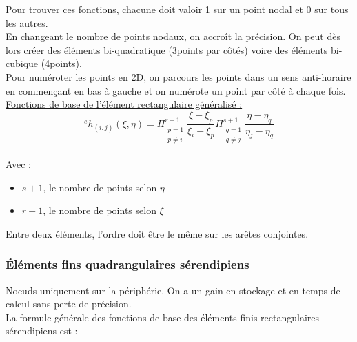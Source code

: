 \documentclass[../main.tex]{subfiles}
\begin{document}
\warning Pour trouver ces fonctions, chacune doit valoir 1 sur un point nodal et 0 sur tous les autres.\\

En changeant le nombre de points nodaux, on accroît la précision. On peut dès lors créer des éléments bi-quadratique (3points par côtés) voire des éléments bi-cubique (4points).\\

\warning Pour numéroter les points en 2D, on parcours les points dans un sens anti-horaire en commençant en bas à gauche et on numérote un point par côté à chaque fois. \\

\quad \underline{Fonctions de base de l'élément rectangulaire généralisé :}\\
\begin{equation}
    {}^eh_{(i,j)} (\xi, \eta) = \Pi_{\begin{matrix}
        p=1\\ p\neq i\\
    \end{matrix}}^{r+1} \frac{\xi-\xi_p}{\xi_i-\xi_p} \Pi_{\begin{matrix}
        q=1\\q\neq j\\
    \end{matrix}}^{s+1} \frac{\eta-\eta_q}{\eta_j-\eta_q}
\end{equation}

Avec : \begin{itemize}
    \item $s+1$, le nombre de points selon $\eta$\\
    \item $r+1$, le nombre de points selon $\xi$\\
\end{itemize}

\warning Entre deux éléments, l'ordre doit être le même sur les arêtes conjointes.\\

\subsubsection{Éléments fins quadrangulaires sérendipiens}
Noeuds uniquement sur la périphérie. On a un gain en stockage et en temps de calcul sans perte de précision.\\

La formule générale des fonctions de base des éléments finis rectangulaires sérendipiens est : \\
\end{document}
